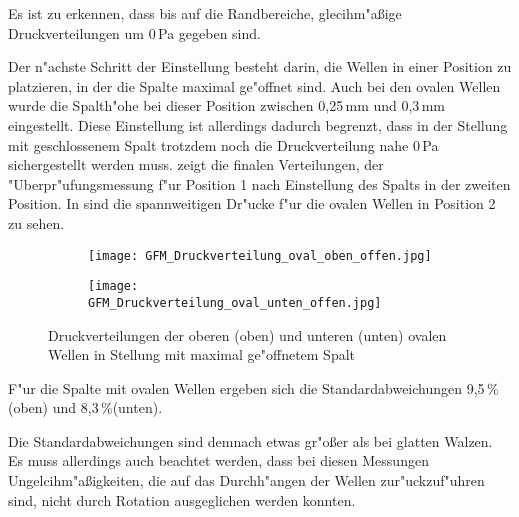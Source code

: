 Es ist zu erkennen, dass bis auf die Randbereiche, glecihm"a\ss{}ige Druckverteilungen um 0\,Pa gegeben sind.

Der n"achste Schritt der Einstellung besteht darin, die Wellen in einer Position zu platzieren, in der die Spalte maximal ge"offnet sind. Auch bei den ovalen Wellen wurde die Spalth"ohe bei dieser Position zwischen 0,25\,mm und 0,3\,mm eingestellt. Diese Einstellung ist allerdings dadurch begrenzt, dass in der Stellung mit geschlossenem Spalt trotzdem noch die Druckverteilung nahe 0\,Pa sichergestellt werden muss.  zeigt die finalen Verteilungen, der "Uberpr"ufungsmessung f"ur Position 1 nach Einstellung des Spalts in der zweiten Position.  
In  sind die spannweitigen Dr"ucke f"ur die ovalen Wellen in Position 2 zu sehen.

\begin{figure}[h]
	\centering
	\begin{subfigure}[c]{0.85\textwidth}		
		\texttt{[image: GFM\_Druckverteilung\_oval\_oben\_offen.jpg]}
	\end{subfigure}
	\begin{subfigure}[c]{0.85\textwidth}
		\texttt{[image: GFM\_Druckverteilung\_oval\_unten\_offen.jpg]}
	\end{subfigure}
	\caption{Druckverteilungen der oberen (oben) und unteren (unten) ovalen Wellen in Stellung mit maximal ge"offnetem Spalt}
	\label{fig:Druckverteilung_oval_offen}
\end{figure}

F"ur die Spalte mit ovalen Wellen ergeben sich die Standardabweichungen 9,5\,\% (oben) und 8,3\,\%(unten).

Die Standardabweichungen sind demnach etwas gr"o\ss{}er als bei glatten Walzen. Es muss allerdings auch beachtet werden, dass bei diesen Messungen Ungelcihm"a\ss{}igkeiten, die auf das Durchh"angen der Wellen zur"uckzuf"uhren sind, nicht durch Rotation ausgeglichen werden konnten.


